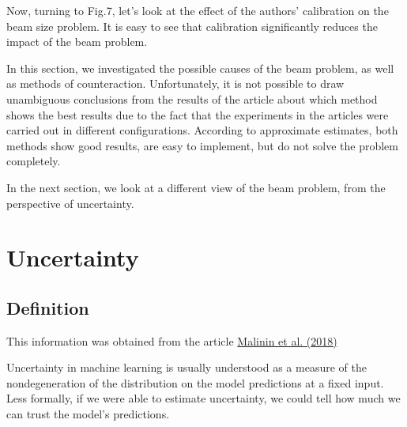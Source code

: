 \documentclass[a4paper,14pt]{extarticle}
\newcommand{\bibref}[3]{\hyperlink{#1}{#2 (#3)}}
\begin{document}
	Now, turning to Fig.7, let's look at the effect of the authors' calibration on the beam size problem. It is easy to see that calibration significantly reduces the impact of the beam problem.
	
	\begin{figure}[t]
	\end{figure}
	
	In this section, we investigated the possible causes of the beam problem, as well as methods of counteraction. Unfortunately, it is not possible to draw unambiguous conclusions from the results of the article about which method shows the best results due to the fact that the experiments in the articles were carried out in different configurations. According to approximate estimates, both methods show good results, are easy to implement, but do not solve the problem completely.
	
	In the next section, we look at a different view of the beam problem, from the perspective of uncertainty.
	
	\section{Uncertainty}
	\subsection{Definition}
	This information was obtained from the article \bibref{prior}{Malinin et al.}{2018}
	
	Uncertainty in machine learning is usually understood as a measure of the nondegeneration of the distribution on the model predictions at a fixed input. Less formally, if we were able to estimate uncertainty, we could tell how much we can trust the model's predictions.
	
\end{document}
